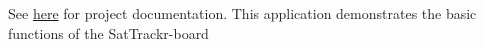 See \mbox{\hyperlink{appdoc_main}{here}} for project documentation. This application demonstrates the basic functions of the Sat\+Trackr-\/board 